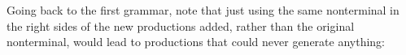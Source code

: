 \documentclass[11pt,fleqn]{article}
\begin{document}
\begin{enumerate}
          \hspace{.2in}%
          \begin{grammar}[1.35]

              \\

              \\

              \\

              \\

              \\

          \end{grammar}

          \smallskip

          Going back to the first grammar, note that just using the same
          nonterminal in the right sides of the new productions added,
          rather than the original nonterminal, would lead to productions
          that could never generate anything:

          \hspace{.2in}%
          \begin{grammar}[1.35]

              \\

              \\

              \\

              \\

          \end{grammar}

          \smallskip


\end{enumerate}
\end{document}
